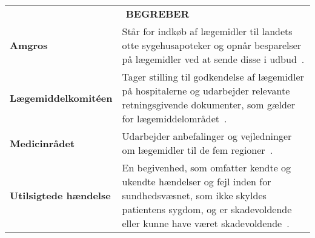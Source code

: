 \begin{table}[H]
\label{table:begreber}
\begin{tabular}{p{4.5cm} p{9.8cm}}
\multicolumn{2}{c}{\cellcolor[HTML]{C0C0C0}\textbf{BEGREBER}} \vspace{0.2cm}\\
\textbf{Amgros} & Står for indkøb af lægemidler til landets otte sygehusapoteker og opnår besparelser på lægemidler ved at sende disse i udbud~\citep{Amgros2018b}. \vspace{0.2cm} \\
\textbf{Lægemiddelkomitéen} & Tager stilling til godkendelse af lægemidler på hospitalerne og udarbejder relevante retningsgivende dokumenter, som gælder for lægemiddelområdet~\citep{RegionNordjylland2018}. \vspace{0.2cm} \\
\textbf{Medicinrådet} & Udarbejder anbefalinger og vejledninger om lægemidler til de fem regioner~\citep{Medicinradet2018}.\vspace{0.2cm} \\
\textbf{Utilsigtede hændelse} & En begivenhed, som omfatter kendte og ukendte hændelser og fejl inden for sundhedsvæsnet, som ikke skyldes patientens sygdom, og er skadevoldende eller kunne have været skadevoldende~\citep{AalborgKommune2017}. \\

\end{tabular}
\end{table}
